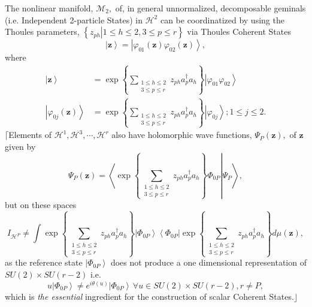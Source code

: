 \documentclass[aps,preprint]{revtex4}%
\begin{document}
The nonlinear manifold, $\mathcal{M}_{2},$ of, in general unnormalized,
decomposable geminals (i.e. Independent 2-particle States) in $\mathcal{H}%
^{2}$ can be coordinatized by using the Thoules parameters, $\left\{  \left.
z_{ph}\right\vert 1\leq h\leq2,3\leq p\leq r\right\}  $ via Thoules Coherent
States
\begin{equation}
\left\vert \mathbf{z}\right\rangle =\left\vert \varphi_{01}\left(
\mathbf{z}\right)  \varphi_{02}\left(  \mathbf{z}\right)  \right\rangle ,
\end{equation}
where
\begin{align}
\left\vert \mathbf{z}\right\rangle  &  =\exp\left\{  \sum
\limits_{\substack{1\leq h\leq2\\3\leq p\leq r}}z_{ph}a_{p}^{\dagger}%
a_{h}\right\}  \left\vert \varphi_{01}\varphi_{02}\right\rangle \\
\left\vert \varphi_{0j}\left(  \mathbf{z}\right)  \right\rangle  &
=\exp\left\{  \sum\limits_{\substack{1\leq h\leq2\\3\leq p\leq r}}z_{ph}%
a_{p}^{\dagger}a_{h}\right\}  \left\vert \varphi_{0j}\right\rangle ;1\leq
j\leq2.
\end{align}
$\lceil$Elements of $\mathcal{H}^{1},\mathcal{H}^{3},\cdots,\mathcal{H}^{r}$
also have holomorphic wave functions, $\Psi_{P}\left(  \mathbf{z}\right)  ,$
of $\mathbf{z}$ given by
\begin{equation}
\Psi_{P}\left(  \mathbf{z}\right)  =\left\langle \left.  \exp\left\{
\sum\limits_{\substack{1\leq h\leq2\\3\leq p\leq r}}z_{ph}a_{p}^{\dagger}%
a_{h}\right\}  \Phi_{0P}\right\vert \Psi_{P}\right\rangle ,
\end{equation}
but on these spaces
\begin{equation}
I_{\mathcal{H}^{P}}\neq\int\exp\left\{  \sum\limits_{\substack{1\leq
h\leq2\\3\leq p\leq r}}z_{ph}a_{p}^{\dagger}a_{h}\right\}  \left\vert
\Phi_{0P}\right\rangle \left\langle \Phi_{0P}\right\vert \exp\left\{
\sum\limits_{\substack{1\leq h\leq2\\3\leq p\leq r}}z_{ph}a_{p}^{\dagger}%
a_{h}\right\}  d\mu\left(  \mathbf{z}\right)  ,
\end{equation}
as the reference state $\left\vert \Phi_{0P}\right\rangle $ does not produce a
one dimensional representation of $SU\left(  2\right)  \times SU\left(
r-2\right)  $ i.e.
\begin{equation}
u\left\vert \Phi_{0P}\right\rangle \neq e^{i\theta\left(  u\right)
}\left\vert \Phi_{0P}\right\rangle \,\forall u\in SU\left(  2\right)  \times
SU\left(  r-2\right)  ,r\neq P,
\end{equation}
which is \emph{the essential} ingredient for the construction of scalar
Coherent States.$\rfloor$
\end{document}
